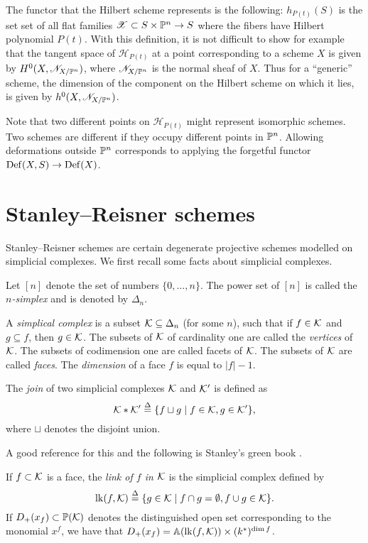 The functor that the Hilbert scheme represents is the following: $h_{P(t)}(S)$ is the set set of all flat families $\mathscr X \subset S \times \P^n  \to S$ where the fibers have Hilbert polynomial $P(t)$. With this definition, it is not difficult to show for example that the tangent space of $\mathscr H_{P(t)}$ at a point corresponding to a scheme $X$ is given by $H^0(X,\mathscr N_{X/\P^n})$, where $\mathscr N_{X/\P^n}$ is the normal sheaf of $X$. Thus for a ``generic'' scheme, the dimension of the component on the Hilbert scheme on which it lies, is given by $h^0(X,\mathscr N_{X/\P^n})$.

Note that two different points on $\mathscr H_{P(t)}$ might represent isomorphic schemes. Two schemes are different if they occupy different points in $\P^n$. Allowing deformations outside $\P^n$ corresponds to applying the forgetful functor $\Def(X,S) \to \Def(X)$.





\section{Stanley--Reisner schemes}

Stanley--Reisner schemes are certain degenerate projective schemes modelled on simplicial complexes. We first recall some facts about simplicial complexes. 

Let $[n]$ denote the set of numbers $\{0,\ldots,n \}$. The power set of $[n]$ is called the \emph{$n$-simplex} and is denoted by $\Delta_n$.

\begin{definition}
A \emph{simplical complex} is a subset $\K \subseteq \Delta_n$ (for some $n$), such that if $f \in \K$ and $g \subseteq f$, then $g \in \K$. The subsets of $\K$ of cardinality one are called the \emph{vertices} of $\K$. The subsets of codimension one are called {facets} of $\K$. The subsets of $\K$ are called \emph{faces}. The \emph{dimension} of a face $f$ is equal to $|f| - 1$. 
\end{definition}


The \emph{join} of two simplicial complexes $\K$ and $\K'$ is defined as
$$
\K \ast \K' \stackrel{\Delta}{=} \{ f \sqcup g \mid f \in \K, g \in \K' \},
$$
where $\sqcup$ denotes the disjoint union. 

A good reference for this and the following is Stanley's green book \cite{stanley_green}.


If $f \subset \K$ is a face, the \emph{link of $f$ in $\K$} is the simplicial complex defined by
$$
\lk(f,\K) \stackrel{\Delta}{=} \{ g \in \K \mid f \cap g = \emptyset, f \cup g \in \K \}.
$$
If $D_+(x_f) \subset \P(\K)$ denotes the distinguished open set corresponding to the monomial $x^f$, we have that $D_+(x_f) = \A(\lk(f,\K)) \times (k^\ast)^{\dim f}$. 

